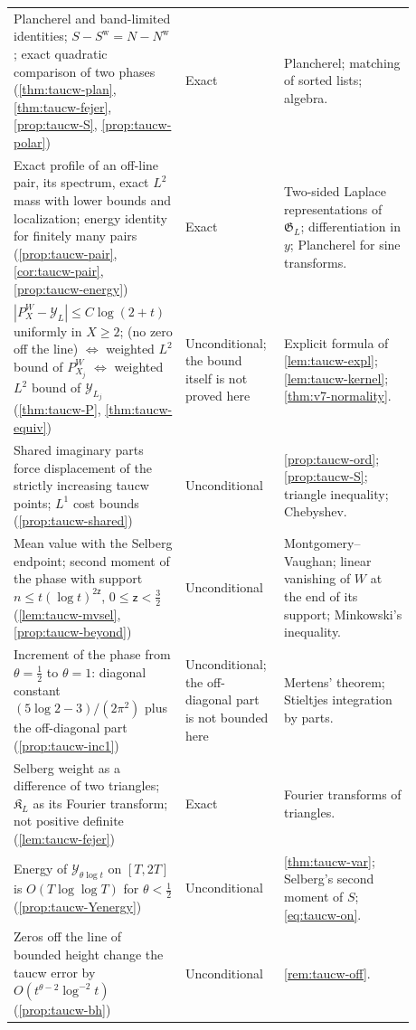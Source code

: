 \documentclass[11pt,a4paper]{article}
\numberwithin{equation}{section}
\theoremstyle{definition}
\theoremstyle{remark}
\begin{document}
\begin{longtable}{@{}p{0.34\linewidth}>{\raggedright\arraybackslash}p{0.23\linewidth}p{0.31\linewidth}@{}}
Plancherel and band-limited identities; $S-S^{\mathrm w}=N-N^{\mathrm w}$; exact quadratic comparison of two phases (\cref{thm:taucw-plan}, \cref{thm:taucw-fejer}, \cref{prop:taucw-S}, \cref{prop:taucw-polar}) & Exact & Plancherel; matching of sorted lists; algebra.\\
Exact profile of an off-line pair, its spectrum, exact $L^2$ mass with lower bounds and localization; energy identity for finitely many pairs (\cref{prop:taucw-pair}, \cref{cor:taucw-pair}, \cref{prop:taucw-energy}) & Exact & Two-sided Laplace representations of $\mathfrak G_L$; differentiation in $y$; Plancherel for sine transforms.\\
$|P^W_X-\mathcal Y_L|\le C\log(2+t)$ uniformly in $X\ge2$; (no zero off the line) $\Leftrightarrow$ weighted $L^2$ bound of $P^W_{X_j}$ $\Leftrightarrow$ weighted $L^2$ bound of $\mathcal Y_{L_j}$ (\cref{thm:taucw-P}, \cref{thm:taucw-equiv}) & Unconditional; the bound itself is not proved here & Explicit formula of \cref{lem:taucw-expl}; \cref{lem:taucw-kernel}; \cref{thm:v7-normality}.\\
Shared imaginary parts force displacement of the strictly increasing taucw points; $L^1$ cost bounds (\cref{prop:taucw-shared}) & Unconditional & \cref{prop:taucw-ord}; \cref{prop:taucw-S}; triangle inequality; Chebyshev.\\
Mean value with the Selberg endpoint; second moment of the phase with support $n\le t(\log t)^{2\mathsf z}$, $0\le\mathsf z<\frac32$ (\cref{lem:taucw-mvsel}, \cref{prop:taucw-beyond}) & Unconditional & Montgomery--Vaughan; linear vanishing of $W$ at the end of its support; Minkowski's inequality.\\
Increment of the phase from $\theta=\frac12$ to $\theta=1$: diagonal constant $(5\log2-3)/(2\pi^2)$ plus the off-diagonal part (\cref{prop:taucw-inc1}) & Unconditional; the off-diagonal part is not bounded here & Mertens' theorem; Stieltjes integration by parts.\\
Selberg weight as a difference of two triangles; $\mathfrak K_L$ as its Fourier transform; not positive definite (\cref{lem:taucw-fejer}) & Exact & Fourier transforms of triangles.\\
Energy of $\mathcal Y_{\theta\log t}$ on $[T,2T]$ is $O(T\log\log T)$ for $\theta<\frac12$ (\cref{prop:taucw-Yenergy}) & Unconditional & \cref{thm:taucw-var}; Selberg's second moment of $S$; \eqref{eq:taucw-on}.\\
Zeros off the line of bounded height change the taucw error by $O(t^{\theta-2}\log^{-2}t)$ (\cref{prop:taucw-bh}) & Unconditional & \cref{rem:taucw-off}.\\

\end{longtable}
\end{document}
